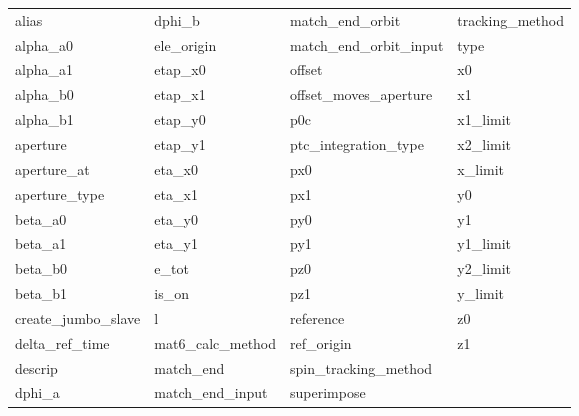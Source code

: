  \begin{tabular}{llll} \toprule
alias                       & dphi_b                      & match_end_orbit             & tracking_method             \\
alpha_a0                    & ele_origin                  & match_end_orbit_input       & type                        \\
alpha_a1                    & etap_x0                     & offset                      & x0                          \\
alpha_b0                    & etap_x1                     & offset_moves_aperture       & x1                          \\
alpha_b1                    & etap_y0                     & p0c                         & x1_limit                    \\
aperture                    & etap_y1                     & ptc_integration_type        & x2_limit                    \\
aperture_at                 & eta_x0                      & px0                         & x_limit                     \\
aperture_type               & eta_x1                      & px1                         & y0                          \\
beta_a0                     & eta_y0                      & py0                         & y1                          \\
beta_a1                     & eta_y1                      & py1                         & y1_limit                    \\
beta_b0                     & e_tot                       & pz0                         & y2_limit                    \\
beta_b1                     & is_on                       & pz1                         & y_limit                     \\
create_jumbo_slave          & l                           & reference                   & z0                          \\
delta_ref_time              & mat6_calc_method            & ref_origin                  & z1                          \\
descrip                     & match_end                   & spin_tracking_method        &                             \\
dphi_a                      & match_end_input             & superimpose                 &                             \\
 \bottomrule
 \end{tabular}
 \vfill
 
